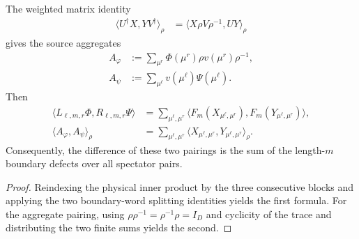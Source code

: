\begin{lemma}
    \label{thm:fnw_overlap_aggregate_decomposition}
    \leanok
    The weighted matrix identity
    \begin{align}
        \langle U^\dagger X,YV^\dagger\rangle_\rho
         & =\langle X\rho V\rho^{-1},UY\rangle_\rho
        \label{eq:fnw_aggregate_summand_pairing}
    \end{align}
    gives the source aggregates
    \begin{align}
        A_\varphi
         & :=\sum_{\mu^r}\Phi(\mu^r)\rho v(\mu^r)\rho^{-1},
        \label{eq:fnw_left_overlap_aggregate}               \\
        A_\psi
         & :=\sum_{\mu^\ell}v(\mu^\ell)\Psi(\mu^\ell).
        \label{eq:fnw_right_overlap_aggregate}
    \end{align}
    Then
    \begin{align}
        \langle L_{\ell,m,r}\Phi,R_{\ell,m,r}\Psi\rangle
         & =\sum_{\mu^\ell,\mu^r}
        \langle F_m(X_{\mu^\ell,\mu^r}),
        F_m(Y_{\mu^\ell,\mu^r})\rangle,
        \label{eq:fnw_overlap_middle_decomposition} \\
        \langle A_\varphi,A_\psi\rangle_\rho
         & =\sum_{\mu^\ell,\mu^r}
        \langle X_{\mu^\ell,\mu^r},Y_{\mu^\ell,\mu^r}\rangle_\rho.
        \label{eq:fnw_aggregate_pairing}
    \end{align}
    Consequently, the difference of these two pairings is the sum of the
    length-$m$ boundary defects over all spectator pairs.
\end{lemma}

\begin{proof}
    \leanok
    Reindexing the physical inner product by the three consecutive blocks and
    applying the two boundary-word splitting identities yields the first
    formula. For the aggregate pairing, using $\rho\rho^{-1}=\rho^{-1}\rho=I_D$
    and cyclicity of the trace and distributing the two finite sums yields the
    second.
\end{proof}

